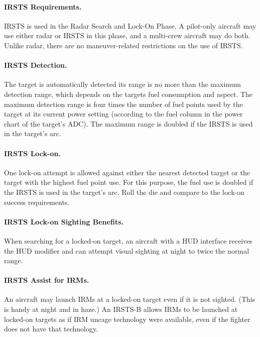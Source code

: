 \begin{advancedrules}
{\paragraph{IRSTS Requirements.}  IRSTS is used in the Radar Search and Lock-On Phase. A pilot-only aircraft may use either radar or IRSTS in this phase, and a multi-crew aircraft may do both. Unlike radar, there are no maneuver-related restrictions on the use of IRSTS.

\paragraph{IRSTS Detection.} The target is automatically detected its range is no more than the maximum detection range, which depends on the targets fuel consumption and aspect. The maximum detection range is four times the number of fuel points used by the target at its current power setting (according to the fuel column in the power chart of the target’s ADC). The maximum range is doubled if the IRSTS is used in the target’s  arc. 

\paragraph{IRSTS Lock-on.} One lock-on attempt is allowed against either the nearest detected target or the target with the highest fuel point use. For this purpose, the fuel use is doubled if the IRSTS is used in the target’s   arc. Roll the die and compare to the lock-on success requirements.

\paragraph{IRSTS Lock-on Sighting Benefits.} When searching for a locked-on target, an aircraft with a HUD interface receives the HUD modifier and can attempt visual sighting at night to twice the normal range.

\paragraph{IRSTS Assist for IRMs.} An aircraft may launch IRMs at a locked-on target even if it is not sighted. (This is handy at night and in haze.) An IRSTS-B allows IRMs to be launched at locked-on targets as if IRM uncage technology were available, even if the fighter does not have that technology.

}


\end{advancedrules}
